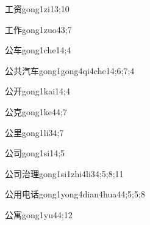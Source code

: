 \begin{verbete}{工资}{gong1zi1}{3;10}
\end{verbete}

\begin{verbete}{工作}{gong1zuo4}{3;7}
\end{verbete}

\begin{verbete}{公车}{gong1che1}{4;4}
\end{verbete}

\begin{verbete}{公共汽车}{gong1gong4qi4che1}{4;6;7;4}
\end{verbete}

\begin{verbete}{公开}{gong1kai1}{4;4}
\end{verbete}

\begin{verbete}{公克}{gong1ke4}{4;7}
\end{verbete}

\begin{verbete}{公里}{gong1li3}{4;7}
\end{verbete}

\begin{verbete}{公司}{gong1si1}{4;5}
\end{verbete}

\begin{verbete}{公司治理}{gong1si1zhi4li3}{4;5;8;11}
\end{verbete}

\begin{verbete}{公用电话}{gong1yong4dian4hua4}{4;5;5;8}
\end{verbete}

\begin{verbete}{公寓}{gong1yu4}{4;12}
\end{verbete}


